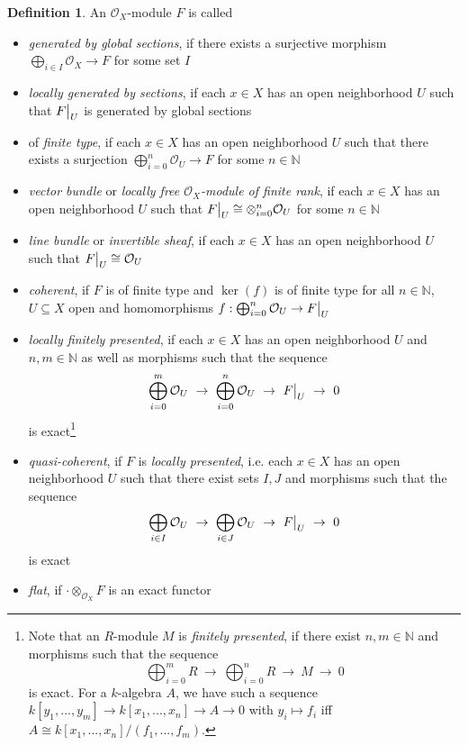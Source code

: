 \documentclass{scrartcl}
\newcommand{\N}{\mathbb{N}}
\renewcommand{\O}{\mathcal{O}}
\newcommand\restr[2]{{
    \left.\kern-\nulldelimiterspace
    #1
    \vphantom{\big|}
    \right|_{#2}
}}
\theoremstyle{definition}
\newtheorem{definition}[prop]{Definition}
\begin{document}
\begin{definition}
    An $\O_X$-module $F$ is called
    \begin{itemize}
        \item \emph{generated by global sections}, if there exists a surjective morphism $\bigoplus_{i \in I} \O_X \to F$ for some set $I$
        \item \emph{locally generated by sections}, if each $x \in X$ has an open neighborhood $U$ such that $\restr{F}{U}$ is generated by global sections
        \item of \emph{finite type}, if each $x \in X$ has an open neighborhood $U$ such that there exists a surjection $\bigoplus_{i = 0}^n \O_U \to F$ for some $n \in \N$
        \item \emph{vector bundle} or \emph{locally free $\O_X$-module of finite rank}, if each $x \in X$ has an open neighborhood $U$ such that $\restr{F}{U} \cong \otimes_{i = 0}^n \O_U$ for some $n \in \N$
        \item \emph{line bundle} or \emph{invertible sheaf}, if each $x \in X$ has an open neighborhood $U$ such that $\restr{F}{U} \cong \O_U$
        \item \emph{coherent}, if $F$ is of finite type and $\ker(f)$ is of finite type for all $n \in \N$, $U \subseteq X$ open and homomorphisms $f: \bigoplus_{i = 0}^n \O_U \to \restr{F}{U}$
        \item \emph{locally finitely presented}, if each $x \in X$ has an open neighborhood $U$ and $n, m \in \N$ as well as morphisms such that the sequence
        \begin{equation*}
            \bigoplus_{i = 0}^m \O_U \ \to \ \bigoplus_{i = 0}^n \O_U \ \to \ \restr{F}{U} \ \to \ 0
        \end{equation*}
        is exact\footnote{
            Note that an $R$-module $M$ is \emph{finitely presented}, if there exist $n, m \in \N$ and morphisms such that the sequence
            \begin{equation*}
                \bigoplus_{i = 0}^m R \ \to \ \bigoplus_{i = 0}^n R \ \to \ M \ \to \ 0
            \end{equation*} 
            is exact.
            For a $k$-algebra $A$, we have such a sequence $k[y_1, ..., y_m] \to k[x_1, ..., x_n] \to A \to 0$ with $y_i \mapsto f_i$ iff $A \cong k[x_1, ..., x_n]/(f_1, ..., f_m)$.
        }
        \item \emph{quasi-coherent}, if $F$ is \emph{locally presented}, i.e. each $x \in X$ has an open neighborhood $U$ such that there exist sets $I, J$ and morphisms such that the sequence
        \begin{equation*}
            \bigoplus_{i \in I} \O_U \ \to \ \bigoplus_{i \in J} \O_U \ \to \ \restr{F}{U} \ \to \ 0
        \end{equation*}
        is exact
        \item \emph{flat}, if $\cdot \otimes_{\O_X} F$ is an exact functor
    \end{itemize}
\end{definition}
\end{document}
